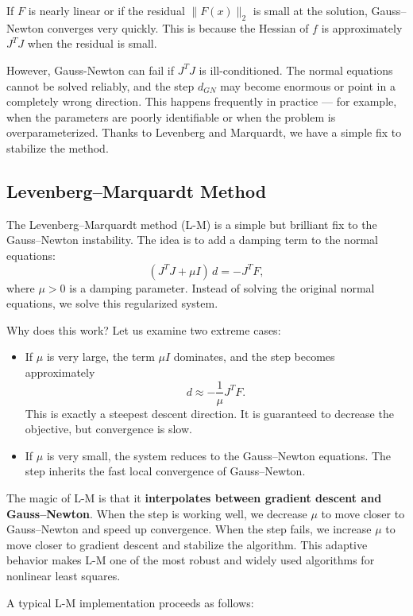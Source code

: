 \documentclass[lang=en,color=blue,mode=fancy,titlestyle=hang]{elegantbook}
\begin{document}
If $F$ is nearly linear or if the residual $\|F(x)\|_2$ is small at the solution, Gauss–Newton
converges very quickly. This is because the Hessian of $f$ is approximately $J^T J$ when the
residual is small.

However, Gauss-Newton can fail if $J^T J$ is ill-conditioned. The normal equations cannot be
solved reliably, and the step $d_{GN}$ may become enormous or point in a completely wrong direction.
This happens frequently in practice — for example, when the parameters are poorly identifiable
or when the problem is overparameterized. Thanks to Levenberg and Marquardt, we have a simple fix
to stabilize the method.

\subsection{Levenberg–Marquardt Method}

The Levenberg–Marquardt method (L-M) is a simple but brilliant fix to the Gauss–Newton instability.
The idea is to add a damping term to the normal equations:
\[
(J^T J + \mu I) \, d = -J^T F,
\]
where $\mu > 0$ is a damping parameter. Instead of solving the original normal equations, we solve
this regularized system.

Why does this work? Let us examine two extreme cases:
\begin{itemize}
  \item If $\mu$ is very large, the term $\mu I$ dominates, and the step becomes approximately
  \[
  d \approx -\frac{1}{\mu} J^T F.
  \]
  This is exactly a steepest descent direction. It is guaranteed to decrease the objective,
  but convergence is slow.
  \item If $\mu$ is very small, the system reduces to the Gauss–Newton equations. The step inherits
  the fast local convergence of Gauss–Newton.
\end{itemize}

The magic of L-M is that it \textbf{interpolates between gradient descent and Gauss–Newton}.
When the step is working well, we decrease $\mu$ to move closer to Gauss–Newton and speed up
convergence. When the step fails, we increase $\mu$ to move closer to gradient descent and stabilize
the algorithm. This adaptive behavior makes L-M one of the most robust and widely used algorithms
for nonlinear least squares.

A typical L-M implementation proceeds as follows:
\end{document}

